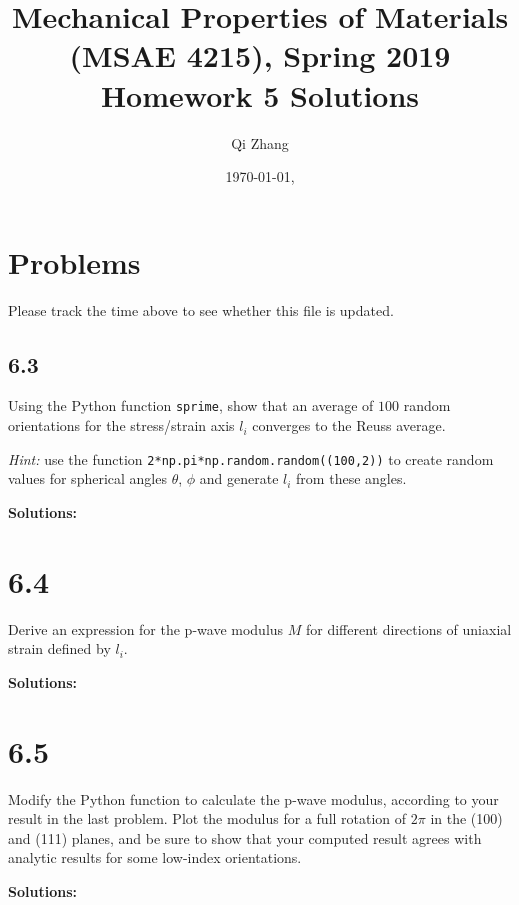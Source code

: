 \documentclass[12pt]{article}
\begin{document}

\title{Mechanical Properties of Materials (MSAE 4215), Spring 2019\\ Homework 5 Solutions}
\author{Qi Zhang}
\date{\today, \currenttime}

\maketitle

\tableofcontents

\section{Problems}
Please track the time above to see whether this file is updated.

\subsection{6.3}
Using the Python function \texttt{sprime}, show that an average of $100$
random orientations for the stress/strain axis $l_i$ converges to the Reuss average.

\textit{Hint:} use the function
\texttt{2*np.pi*np.random.random((100,2))} to create random
values for spherical angles $\theta$, $\phi$ and generate $l_i$ from these angles.

\textbf{Solutions:}


\section{6.4}
Derive an expression for the p-wave modulus $M$ for different directions
of uniaxial strain defined by $l_i$.

\textbf{Solutions:}


\section{6.5}
Modify the Python function to calculate the p-wave modulus,
according to your result in the last problem.  Plot the modulus for a
full rotation of $2\pi$ in the \hkl(100) and \hkl(111) planes, and be sure to show that
your computed result agrees with analytic results for some low-index orientations.

\textbf{Solutions:}
\end{document}
